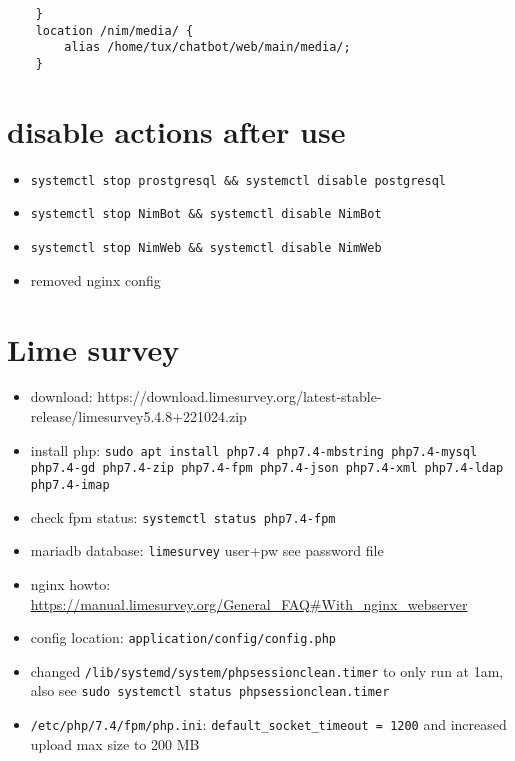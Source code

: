 \documentclass{article}
\begin{document}
\begin{verbatim}
    }                                                                                                                                                                                                                                                         
    location /nim/media/ {                                                                                                                                                                                                                                    
        alias /home/tux/chatbot/web/main/media/;                                                                                                                                                                                                              
    }    
\end{verbatim}

\section{disable actions after use}

\begin{itemize}
    \item \verb|systemctl stop prostgresql && systemctl disable postgresql|
    \item \verb|systemctl stop NimBot && systemctl disable NimBot|
    \item \verb|systemctl stop NimWeb && systemctl disable NimWeb|
    \item removed nginx config
\end{itemize}

\section{Lime survey}
\begin{itemize}
    \item download: https://download.limesurvey.org/latest-stable-release/limesurvey5.4.8+221024.zip
    \item install php: \verb|sudo apt install php7.4 php7.4-mbstring php7.4-mysql php7.4-gd php7.4-zip php7.4-fpm php7.4-json php7.4-xml php7.4-ldap php7.4-imap|
    \item check fpm status: \verb|systemctl status php7.4-fpm|
    \item mariadb database: \verb|limesurvey| user+pw see password file
    \item nginx howto: \url{https://manual.limesurvey.org/General_FAQ#With_nginx_webserver}
    \item config location: \verb|application/config/config.php|
    \item changed \verb|/lib/systemd/system/phpsessionclean.timer| to only run at 1am, also see \verb|sudo systemctl status phpsessionclean.timer|
    \item \verb|/etc/php/7.4/fpm/php.ini|: \verb|default_socket_timeout = 1200| and increased upload max size to 200 MB 
\end{itemize}
\end{document}
